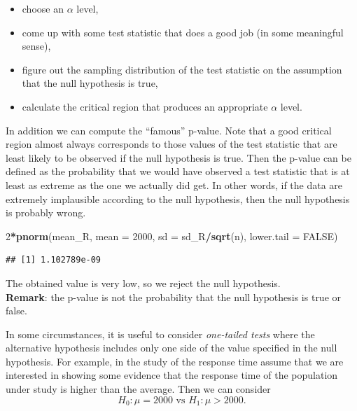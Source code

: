 \documentclass[
]{article}
\newenvironment{Shaded}{\begin{snugshade}}{\end{snugshade}}
\newcommand{\AttributeTok}[1]{\textcolor[rgb]{0.13,0.29,0.53}{#1}}
\newcommand{\ConstantTok}[1]{\textcolor[rgb]{0.56,0.35,0.01}{#1}}
\newcommand{\DecValTok}[1]{\textcolor[rgb]{0.00,0.00,0.81}{#1}}
\newcommand{\FunctionTok}[1]{\textcolor[rgb]{0.13,0.29,0.53}{\textbf{#1}}}
\newcommand{\NormalTok}[1]{#1}
\newcommand{\SpecialCharTok}[1]{\textcolor[rgb]{0.81,0.36,0.00}{\textbf{#1}}}
\providecommand{\tightlist}{%
  \setlength{\itemsep}{0pt}\setlength{\parskip}{0pt}}
\begin{document}
\begin{itemize}
\tightlist
\item
  choose an \(\alpha\) level,
\item
  come up with some test statistic that does a good job (in some
  meaningful sense),
\item
  figure out the sampling distribution of the test statistic on the
  assumption that the null hypothesis is true,
\item
  calculate the critical region that produces an appropriate \(\alpha\)
  level.
\end{itemize}

In addition we can compute the ``famous'' p-value. Note that a good
critical region almost always corresponds to those values of the test
statistic that are least likely to be observed if the null hypothesis is
true. Then the p-value can be defined as the probability that we would
have observed a test statistic that is at least as extreme as the one we
actually did get. In other words, if the data are extremely implausible
according to the null hypothesis, then the null hypothesis is probably
wrong.

\begin{Shaded}
\begin{Highlighting}[]
\DecValTok{2}\SpecialCharTok{*}\FunctionTok{pnorm}\NormalTok{(mean\_R, }
      \AttributeTok{mean =} \DecValTok{2000}\NormalTok{,}
      \AttributeTok{sd =}\NormalTok{ sd\_R}\SpecialCharTok{/}\FunctionTok{sqrt}\NormalTok{(n),}
      \AttributeTok{lower.tail =} \ConstantTok{FALSE}\NormalTok{)}
\end{Highlighting}
\end{Shaded}

\begin{verbatim}
## [1] 1.102789e-09
\end{verbatim}

The obtained value is very low, so we reject the null hypothesis.\\
\textbf{Remark}: the p-value is not the probability that the null
hypothesis is true or false.

In some circumstances, it is useful to consider \emph{one-tailed tests}
where the alternative hypothesis includes only one side of the value
specified in the null hypothesis. For example, in the study of the
response time assume that we are interested in showing some evidence
that the response time of the population under study is higher than the
average. Then we can consider
\[H_0: \mu = 2000 \mbox{ vs } H_1: \mu > 2000.\]
\end{document}
